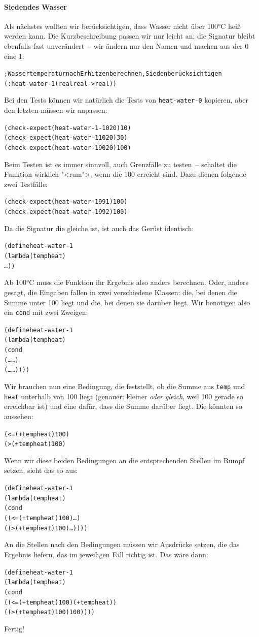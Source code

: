 \paragraph{Siedendes Wasser} Als nächstes wollten wir berücksichtigen,
dass Wasser nicht über 100°C heiß werden kann.  Die Kurzbeschreibung
passen wir nur leicht an; die Signatur bleibt ebenfalls fast
unverändert~-- wir ändern nur den Namen und machen aus der 0 eine 1:
%
\begin{alltt}
; Wassertemperatur nach Erhitzen berechnen, Sieden berücksichtigen
(: heat-water-1 (real real -> real))
\end{alltt}
%
Bei den Tests können wir natürlich die Tests von \texttt{heat-water-0}
kopieren, aber den letzten müssen wir anpassen:
%
\begin{alltt}
(check-expect (heat-water-1 -10 20) 10)
(check-expect (heat-water-1 10 20) 30)
(check-expect (heat-water-1 90 20) 100)
\end{alltt}
%
Beim Testen ist es immer sinnvoll, auch Grenzfälle zu testen~--
schaltet die Funktion wirklich "<rum">, wenn die 100 erreicht sind.
Dazu dienen folgende zwei Testfälle:
%
\begin{alltt}
(check-expect (heat-water-1 99 1) 100)
(check-expect (heat-water-1 99 2) 100)
\end{alltt}
%
Da die Signatur die gleiche ist, ist auch das Gerüst identisch:
%
\begin{alltt}
(define heat-water-1
  (lambda (temp heat)
    \ldots))
\end{alltt}
%
Ab 100°C muss die Funktion ihr Ergebnis also anders berechnen.  Oder,
anders gesagt, die Eingaben fallen in zwei verschiedene Klassen: die,
bei denen die Summe unter 100 liegt und die, bei denen sie darüber
liegt.
Wir benötigen also ein \texttt{cond} mit zwei
Zweigen:
%
\begin{alltt}
(define heat-water-1
  (lambda (temp heat)
    (cond
      (\ldots \ldots)
      (\ldots \ldots))))
\end{alltt}
%
Wir brauchen nun eine Bedingung, die feststellt, ob die Summe aus
\texttt{temp} und \texttt{heat} unterhalb von 100 liegt (genauer:
kleiner \emph{oder gleich}, weil 100 gerade so erreichbar ist) und
eine dafür, dass die Summe darüber liegt.  Die könnten so aussehen:
%
\begin{alltt}
(<= (+ temp heat) 100)
(> (+ temp heat) 100)
\end{alltt}
%
Wenn wir diese beiden Bedingungen an die entsprechenden Stellen im
Rumpf setzen, sieht das so aus:
%
\begin{alltt}
(define heat-water-1
  (lambda (temp heat)
    (cond
      ((<= (+ temp heat) 100) \ldots)
      ((> (+ temp heat) 100) \ldots))))
\end{alltt}
%
An die Stellen nach den Bedingungen müssen wir Ausdrücke setzen, die
das Ergebnis liefern, das im jeweiligen Fall richtig ist.  Das wäre dann:
%
\begin{alltt}
(define heat-water-1
  (lambda (temp heat)
    (cond
      ((<= (+ temp heat) 100) (+ temp heat))
      ((> (+ temp heat) 100) 100))))
\end{alltt}
%
Fertig!
%
%

